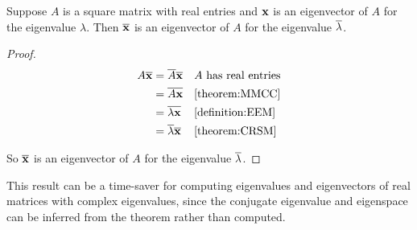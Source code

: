 \documentclass{ximera}
\begin{document}
\begin{theorem}
\label{theorem:ERMCP}

Suppose $A$ is a square matrix with real entries and $\mathbf{x}$ is an eigenvector of $A$ for the eigenvalue $\lambda$.  Then $\overline{\mathbf{x}}$ is an eigenvector of $A$ for the eigenvalue $\overline{\lambda}$.


\begin{proof}

\begin{align*}
A\overline{\mathbf{x}}&=\overline{A}\overline{\mathbf{x}}&&\text{$A$ has real entries}\\
&=\overline{A\mathbf{x}}&&\ref{theorem:MMCC}\\
&=\overline{\lambda\mathbf{x}}&&\ref{definition:EEM}\\
&=\overline{\lambda}\overline{\mathbf{x}}&&\ref{theorem:CRSM}
\end{align*}

So $\overline{\mathbf{x}}$ is an eigenvector of $A$ for the eigenvalue $\overline{\lambda}$.

\end{proof}
\end{theorem}

This result can be a time-saver for computing eigenvalues and eigenvectors of real matrices with complex eigenvalues, since the conjugate eigenvalue and eigenspace can be inferred from the theorem rather than computed.
\end{document}
